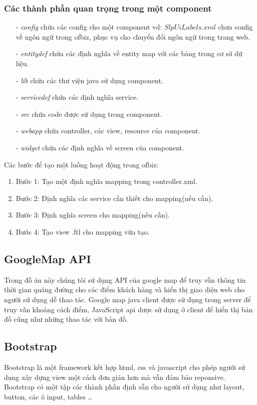 \documentclass[a4paper,12pt]{report}
\begin{document}
\subsubsection{Các thành phần quan trọng trong một component}
\begin{itemize}
\item[-] \textit{config} chứa các config cho một component vd: $SlpUiLabels.xml$ chưa config về ngôn ngữ trong ofbiz, phục vụ cho chuyển đổi ngôn ngữ trong trang web.
\item[-] \textit{entitydef} chứa các định nghĩa về entity map với các bảng trong cơ sở dữ liệu.
\item[-] \textit{lib} chứa các thư viện java sử dụng component.
\item[-] \textit{servicedef} chứa các định nghĩa service.
\item[-] \textit{src} chứa code được sử dụng trong component.
\item[-] \textit{webapp} chứa controller, các view, resource của component.
\item[-] \textit{widget} chứa các định nghĩa về screen của component.
\end{itemize}
Các bước để tạo một luồng hoạt động trong ofbiz:
\begin{enumerate}
\item Bước 1: Tạo một định nghĩa mapping trong controller.xml.
\item Bước 2: Định nghĩa các service cần thiết cho mapping(nếu cần).
\item Bước 3: Định nghĩa screen cho mapping(nếu cần).
\item Bước 4: Tạo view .ftl cho mapping vừa tạo.
\end{enumerate}
\subsection{GoogleMap API}
Trong đồ án này chúng tôi sử dụng API của google map để truy vẫn thông tin thời gian quãng đường cho các điểm khách hàng và hiển thị giao diện web cho người sử dụng dễ thao tác. Google map java client được sử dụng trong server để truy vấn khoảng cách điểm, JavaScript api dược sử dụng ở client để hiển thị bản đồ cũng như những thao tác với bản đồ.
\subsection{Bootstrap}
Bootstrap là một framework kết hợp html, css và javascript cho phép ngưới sử dụng xây dựng view một cách đơn giản hơn mà vẫn đảm bảo reponsive. Bootstrap có một tập các thành phần định sẵn cho người sử dụng như layout, button, các ô input, tables \ldots
\end{document}

